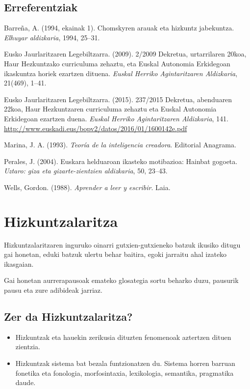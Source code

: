 \documentclass[
]{book}
\providecommand{\tightlist}{%
  \setlength{\itemsep}{0pt}\setlength{\parskip}{0pt}}
\begin{document}
\hypertarget{T1E}{%
\section*{Erreferentziak}\label{T1E}}

Barreña, A. (1994, ekainak 1). Chomskyren arauak eta hizkuntz jabekuntza. \emph{Elhuyar aldizkaria}, 1994, 25--31.

Eusko Jaurlaritzaren Legebiltzarra. (2009). 2/2009 Dekretua, urtarrilaren 20koa, Haur Hezkuntzako curriculuma zehaztu, eta Euskal Autonomia Erkidegoan ikaskuntza horiek ezartzen dituena. \emph{Euskal Herriko Agintaritzaren Aldizkaria}, 21(469), 1--41.

Eusko Jaurlaritzaren Legebiltzarra. (2015). 237/2015 Dekretua, abenduaren 22koa, Haur Hezkuntzaren curriculuma zehaztu eta Euskal Autonomia Erkidegoan ezartzen duena. \emph{Euskal Herriko Agintaritzaren Aldizkaria}, 141. \url{http://www.euskadi.eus/bopv2/datos/2016/01/1600142e.pdf}

Marina, J. A. (1993). \emph{Teoría de la inteligencia creadora}. Editorial Anagrama.

Perales, J. (2004). Euskara helduaroan ikasteko motibazioa: Hainbat gogoeta. \emph{Uztaro: giza eta gizarte-zientzien aldizkaria}, 50, 23--43.

Wells, Gordon. (1988). \emph{Aprender a leer y escribir}. Laia.

\hypertarget{hizkuntzalaritza}{%
\chapter{Hizkuntzalaritza}\label{hizkuntzalaritza}}

Hizkuntzalaritzaren inguruko oinarri gutxien-gutxieneko batzuk ikusiko ditugu gai honetan, eduki batzuk ulertu behar baitira, egoki jarraitu ahal izateko ikasgaian.

Gai honetan aurrerapausoak emateko glosategia sortu beharko duzu, pausurik pausu eta zure adibideak jarriaz.

\hypertarget{zer-da-hizkuntzalaritza}{%
\section{Zer da Hizkuntzalaritza?}\label{zer-da-hizkuntzalaritza}}

\begin{itemize}
\tightlist
\item
  Hizkuntzak eta hauekin zerikusia dituzten fenomenoak aztertzen
  dituen zientzia.
\item
  Hizkuntzak sistema bat bezala funtzionatzen du. Sistema horren
  barruan fonetika eta fonologia, morfosintaxia, lexikologia,
  semantika, pragmatika daude.
\end{itemize}
\end{document}
